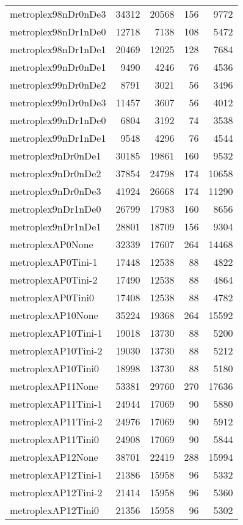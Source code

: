 \begin{longtable}{lrrrr}
metroplex98nDr0nDe3 & 34312 & 20568 & 156 & 9772 \\
metroplex98nDr1nDe0 & 12718 & 7138 & 108 & 5472 \\
metroplex98nDr1nDe1 & 20469 & 12025 & 128 & 7684 \\
metroplex99nDr0nDe1 & 9490 & 4246 & 76 & 4536 \\
metroplex99nDr0nDe2 & 8791 & 3021 & 56 & 3496 \\
metroplex99nDr0nDe3 & 11457 & 3607 & 56 & 4012 \\
metroplex99nDr1nDe0 & 6804 & 3192 & 74 & 3538 \\
metroplex99nDr1nDe1 & 9548 & 4296 & 76 & 4544 \\
metroplex9nDr0nDe1 & 30185 & 19861 & 160 & 9532 \\
metroplex9nDr0nDe2 & 37854 & 24798 & 174 & 10658 \\
metroplex9nDr0nDe3 & 41924 & 26668 & 174 & 11290 \\
metroplex9nDr1nDe0 & 26799 & 17983 & 160 & 8656 \\
metroplex9nDr1nDe1 & 28801 & 18709 & 156 & 9304 \\
metroplexAP0None & 32339 & 17607 & 264 & 14468 \\
metroplexAP0Tini-1 & 17448 & 12538 & 88 & 4822 \\
metroplexAP0Tini-2 & 17490 & 12538 & 88 & 4864 \\
metroplexAP0Tini0 & 17408 & 12538 & 88 & 4782 \\
metroplexAP10None & 35224 & 19368 & 264 & 15592 \\
metroplexAP10Tini-1 & 19018 & 13730 & 88 & 5200 \\
metroplexAP10Tini-2 & 19030 & 13730 & 88 & 5212 \\
metroplexAP10Tini0 & 18998 & 13730 & 88 & 5180 \\
metroplexAP11None & 53381 & 29760 & 270 & 17636 \\
metroplexAP11Tini-1 & 24944 & 17069 & 90 & 5880 \\
metroplexAP11Tini-2 & 24976 & 17069 & 90 & 5912 \\
metroplexAP11Tini0 & 24908 & 17069 & 90 & 5844 \\
metroplexAP12None & 38701 & 22419 & 288 & 15994 \\
metroplexAP12Tini-1 & 21386 & 15958 & 96 & 5332 \\
metroplexAP12Tini-2 & 21414 & 15958 & 96 & 5360 \\
metroplexAP12Tini0 & 21356 & 15958 & 96 & 5302 \\

\end{longtable}
